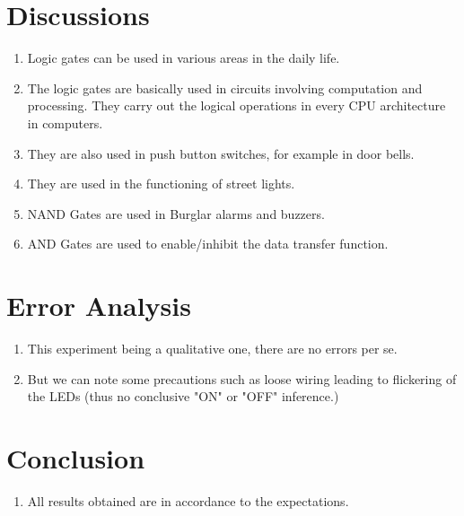 \section{Discussions}
\begin{enumerate}
    \item Logic gates can be used in various areas in the daily life.
    \item The logic gates are basically used in circuits involving computation and processing. They carry out the logical operations in every CPU architecture in computers.
    \item They are also used in push button switches, for example in door bells.
    \item They are used in the functioning of street lights.
    \item NAND Gates are used in Burglar alarms and buzzers.
    \item AND Gates are used to enable/inhibit the data transfer function.
\end{enumerate}
\section{Error Analysis}
\begin{enumerate}
    \item This experiment being a qualitative one, there are no errors per se.
    \item But we can note some precautions such as loose wiring leading to flickering of the LEDs (thus no conclusive "ON" or "OFF" inference.)
\end{enumerate}
\section{Conclusion}
\begin{enumerate}
    \item All results obtained are in accordance to the expectations.
\end{enumerate}